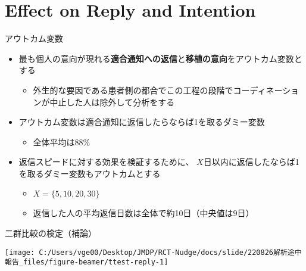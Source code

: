\documentclass[
      aspectratio=169,
        12pt,
    ]{beamer}
\renewcommand{\textbf}[1]{{\color{DarkBlue}\bfseries#1}}
\providecommand{\tightlist}{%
  \setlength{\itemsep}{0pt}\setlength{\parskip}{0pt}}
\begin{document}
\hypertarget{effect-on-reply-and-intention}{%
\section{Effect on Reply and Intention}\label{effect-on-reply-and-intention}}

\begin{frame}{アウトカム変数}
\protect\hypertarget{ux30a2ux30a6ux30c8ux30abux30e0ux5909ux6570}{}
\begin{itemize}
\tightlist
\item
  最も個人の意向が現れる\textbf{適合通知への返信}と\textbf{移植の意向}をアウトカム変数とする

  \begin{itemize}
  \tightlist
  \item
    外生的な要因である患者側の都合でこの工程の段階でコーディネーションが中止した人は除外して分析をする
  \end{itemize}
\item
  アウトカム変数は適合通知に返信したらならば1を取るダミー変数

  \begin{itemize}
  \tightlist
  \item
    全体平均は88\%
  \end{itemize}
\item
  返信スピードに対する効果を検証するために、
  \(X\)日以内に返信したならば1を取るダミー変数もアウトカムとする

  \begin{itemize}
  \tightlist
  \item
    \(X = \{5, 10, 20, 30\}\)
  \item
    返信した人の平均返信日数は全体で約10日（中央値は9日）
  \end{itemize}
\end{itemize}
\end{frame}

\begin{frame}{二群比較の検定（補論）}
\protect\hypertarget{ux4e8cux7fa4ux6bd4ux8f03ux306eux691cux5b9aux88dcux8ad6}{}
\begin{center}\texttt{[image: C:/Users/vge00/Desktop/JMDP/RCT-Nudge/docs/slide/220826解析途中報告\_files/figure-beamer/ttest-reply-1]} \end{center}
\end{frame}
\end{document}
